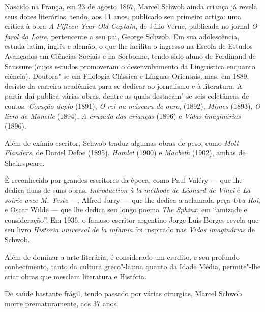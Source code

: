 \documentclass[12pt]{extarticle}
\begin{document}
Nascido na França, em 23 de agosto 1867, Marcel Schwob ainda criança já revela
seus dotes literários, tendo, aos 11 anos, publicado seu primeiro
artigo: uma crítica à obra \emph{A Fifteen Year Old Captain}, de Júlio Verne,
publicada no jornal \textit{O farol do Loire}, pertencente
a seu pai, George Schwob. Em sua adolescência, estuda latim, inglês e
alemão, o que lhe facilita o ingresso na Escola de Estudos Avançados em
Ciências Sociais e na Sorbonne, tendo
sido aluno de Ferdinand de Saussure (cujos estudos promoveram o
desenvolvimento da Linguística enquanto ciência). Doutora"-se em
Filologia Clássica e Línguas Orientais, mas, em 1889, desiste da
carreira acadêmica para se dedicar ao jornalismo e à literatura. A
partir daí publica várias obras, dentre as quais destacam"-se seis
coletâneas de contos: \textit{Coração duplo} (1891), \textit{O rei na máscara de ouro}, (1892), \textit{Mimes} (1893), \textit{O livro de Monelle} (1894), \textit{A cruzada
das crianças} (1896) e \textit{Vidas imaginárias} (1896).



Além de exímio escritor, Schwob traduz algumas obras de peso, como \textit{Moll
Flanders}, de Daniel Defoe (1895), \textit{Hamlet} (1900) e \textit{Macbeth} (1902), ambas
de Shakespeare.


É reconhecido por grandes escritores da época, como Paul Valéry --- que lhe
dedica duas de suas obras, \textit{Introduction à la méthode de Léonard de Vinci}
e \textit{La soirée avec M. Teste} ---, Alfred Jarry  --- que lhe dedica a aclamada peça
\textit{Ubu Roi}, e Oscar Wilde --- que lhe dedica seu longo poema \textit{The Sphinx}, em
``amizade e consideração''. Em 1936, o famoso escritor argentino Jorge
Luis Borges revela que seu livro \textit{Historia universal de la infâmia} foi
inspirado nas \textit{Vidas imaginárias} de Schwob.

Além de dominar a arte literária, é considerado um erudito, e seu
profundo conhecimento, tanto da cultura greco"-latina quanto da Idade
Média, permite"-lhe criar obras que mesclam literatura e História.

De saúde bastante frágil, tendo passado por várias cirurgias, Marcel
Schwob morre prematuramente, aos 37 anos.
\end{document}
